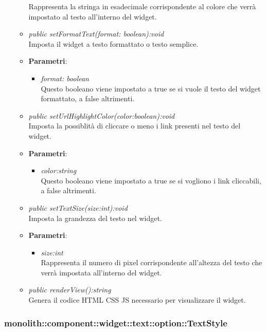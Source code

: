 \begin{itemize}
\begin{itemize}
{\begin{itemize}
		Rappresenta la stringa in esadecimale corrispondente al colore che verrà impostato al testo all'interno del widget.
		\end{itemize}}
	\item \textit{public setFormatText(format: boolean):void}\\
	Imposta il widget a testo formattato o testo semplice.
		\item{\textbf{Parametri}: \begin{itemize}
		\item \textit{format: boolean}\\
		Questo booleano viene impostato a true se si vuole il testo del widget formattato, a false altrimenti.
		\end{itemize}}
	\item \textit{public setUrlHighlightColor(color:boolean):void}\\
	Imposta la possiblità di cliccare o meno i link presenti nel testo del widget.
		\item{\textbf{Parametri}: \begin{itemize}
		\item \textit{color:string}\\
		Questo booleano viene impostato a true se si vogliono i link cliccabili, a false altrimenti.
		\end{itemize}}
	\item \textit{public setTextSize(size:int):void}\\
	Imposta la grandezza del testo nel widget.
		\item{\textbf{Parametri}: \begin{itemize}
		\item \textit{size:int}\\
		Rappresenta il numero di pixel corrispondente all'altezza del testo che verrà impostata all'interno del widget.
		\end{itemize}}
	\item \textit{public renderView():string}\\
	Genera il codice HTML CSS JS necessario per visualizzare il widget.
	\end{itemize}
\end{itemize}

\subsubsection{monolith::component::widget::text::option::TextStyle}

